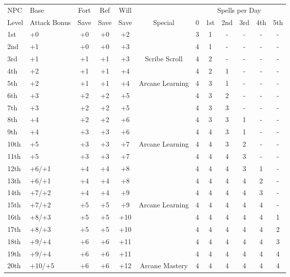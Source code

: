 \documentclass[11pt]{report}
\begin{document}
\begin{tabular}{llcccccccccc}
\hline
NPC & Base & Fort & Ref & Will & & \multicolumn{6}{c}{Spells per Day} \\
Level & Attack Bonus & Save & Save & Save & Special & 0 & 1st & 2nd & 3rd & 4th
& 5th \\
\hline
1st & +0 & +0 & +0 & +2 & & 3 & 1 & - & - & - & - \\
2nd & +1 & +0 & +0 & +3 & & 4 & 1 & - & - & - & - \\
3rd & +1 & +1 & +1 & +3 & Scribe Scroll & 4 & 2 & - & - & - & - \\
4th & +2 & +1 & +1 & +4 & & 4 & 2 & 1 & - & - & - \\
5th & +2 & +1 & +1 & +4 & Arcane Learning & 4 & 3 & 1 & - & - & - \\
6th & +3 & +2 & +2 & +5 & & 4 & 3 & 2 & - & - & - \\
7th & +3 & +2 & +2 & +5 & & 4 & 3 & 3 & - & - & - \\
8th & +4 & +2 & +2 & +6 & & 4 & 3 & 3 & 1 & - & - \\
9th & +4 & +3 & +3 & +6 & & 4 & 4 & 3 & 1 & - & - \\
10th & +5 & +3 & +3 & +7 & Arcane Learning & 4 & 4 & 3 & 2 & - & - \\
11th & +5 & +3 & +3 & +7 & & 4 & 4 & 4 & 3 & - & - \\
12th & +6/+1 & +4 & +4 & +8 & & 4 & 4 & 4 & 3 & 1 & - \\
13th & +6/+1 & +4 & +4 & +8 & & 4 & 4 & 4 & 4 & 2 & - \\
14th & +7/+2 & +4 & +4 & +9 & & 4 & 4 & 4 & 4 & 3 & - \\
15th & +7/+2 & +5 & +5 & +9 & Arcane Learning & 4 & 4 & 4 & 4 & 4 & - \\
16th & +8/+3 & +5 & +5 & +10 & & 4 & 4 & 4 & 4 & 4 & 1 \\
17th & +8/+3 & +5 & +5 & +10 & & 4 & 4 & 4 & 4 & 4 & 2 \\
18th & +9/+4 & +6 & +6 & +11 & & 4 & 4 & 4 & 4 & 4 & 3 \\
19th & +9/+4 & +6 & +6 & +11 & & 4 & 4 & 4 & 4 & 4 & 4 \\
20th & +10/+5 & +6 & +6 & +12 & Arcane Mastery & 4 & 4 & 4 & 4 & 4 & 4 \\
\hline
\end{tabular}
\end{document}
